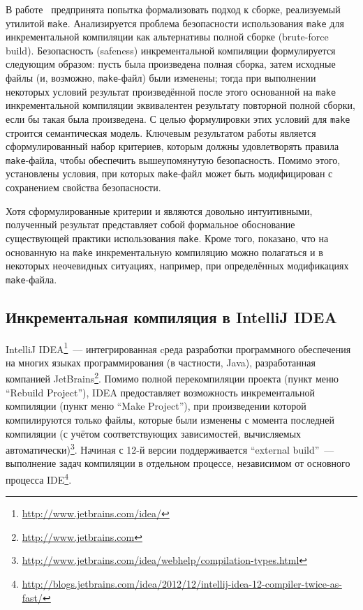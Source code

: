 В работе~\cite{safeness_niels} предпринята попытка формализовать подход к сборке, реализуемый утилитой \texttt{make}. Анализируется проблема безопасности использования \texttt{make} для инкрементальной компиляции как альтернативы полной сборке (brute-force build). Безопасность (safeness) инкрементальной компиляции формулируется следующим образом: пусть была произведена полная сборка, затем исходные файлы (и, возможно, \texttt{make}-файл) были изменены; тогда при выполнении некоторых условий результат произведённой после этого основанной на \texttt{make} инкрементальной компиляции эквивалентен результату повторной полной сборки, если бы такая была произведена. С целью формулировки этих условий для \texttt{make} строится семантическая модель. Ключевым результатом работы является сформулированный набор критериев, которым должны удовлетворять правила \texttt{make}-файла, чтобы обеспечить вышеупомянутую безопасность. Помимо этого, установлены условия, при которых \texttt{make}-файл может быть модифицирован с сохранением свойства безопасности.

Хотя сформулированные критерии и являются довольно интуитивными, полученный результат представляет собой формальное обоснование существующей практики использования \texttt{make}. Кроме того, показано, что на основанную на \texttt{make} инкрементальную компиляцию можно полагаться и в некоторых неочевидных ситуациях, например, при определённых модификациях \texttt{make}-файла.\\

\subsection{Инкрементальная компиляция в IntelliJ IDEA}
IntelliJ IDEA\footnote{\url{http://www.jetbrains.com/idea/}}~--- интегрированная cреда разработки программного обеспечения на многих языках программирования (в частности, Java), разработанная компанией JetBrains\footnote{\url{http://www.jetbrains.com}}. Помимо полной перекомпиляции проекта (пункт меню ``Rebuild Project''), IDEA предоставляет возможность инкрементальной компиляции (пункт меню ``Make Project''), при произведении которой компилируются только файлы, которые были изменены с момента последней компиляции (с учётом соответствующих зависимостей, вычисляемых автоматически)\footnote{\url{http://www.jetbrains.com/idea/webhelp/compilation-types.html}}. Начиная с 12-й версии поддерживается ``external build''~--- выполнение задач компиляции в отдельном процессе, независимом от основного процесса IDE\footnote{\url{http://blogs.jetbrains.com/idea/2012/12/intellij-idea-12-compiler-twice-as-fast/}}.

